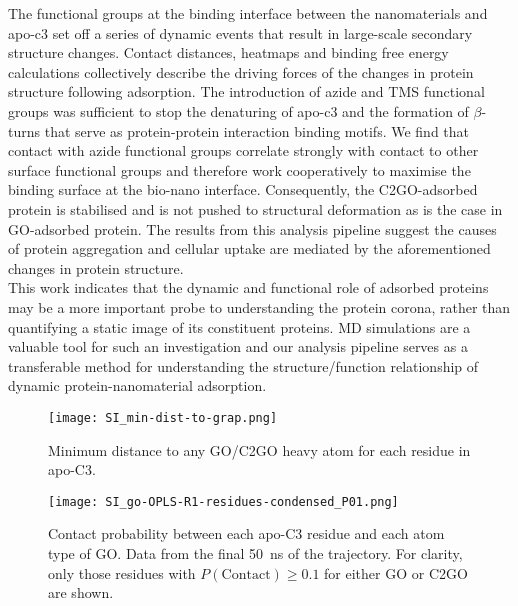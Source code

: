 The functional groups at the binding interface between the nanomaterials and apo-c3 set off a series of dynamic events that result in large-scale secondary structure changes. Contact distances, heatmaps and binding free energy calculations collectively describe the driving forces of the changes in protein structure following adsorption. The introduction of azide and TMS functional groups was sufficient to stop the denaturing of apo-c3 and the formation of $\beta$-turns that serve as protein-protein interaction binding motifs. We find that contact with azide functional groups correlate strongly with contact to other surface functional groups and therefore work cooperatively to maximise the binding surface at the bio-nano interface. Consequently, the C2GO-adsorbed protein is stabilised and is not pushed to structural deformation as is the case in GO-adsorbed protein. The results from this analysis pipeline suggest the causes of protein aggregation and cellular uptake are mediated by the aforementioned changes in protein structure. \\

This work indicates that the dynamic and functional role of adsorbed proteins may be a more important probe to understanding the protein corona, rather than quantifying a static image of its constituent proteins. MD simulations are a valuable tool for such an investigation and our analysis pipeline serves as a transferable method for understanding the structure/function relationship of dynamic protein-nanomaterial adsorption.

%
\begin{figure}[ht!]
    \centering
    \texttt{[image: SI\_min-dist-to-grap.png]}
    \caption{Minimum distance to any GO/C2GO heavy atom for each residue in apo-C3.}
    \label{fig:mid-dist-to-grap}
\end{figure}

\begin{figure}
    \centering
    \texttt{[image: SI\_go-OPLS-R1-residues-condensed\_P01.png]}
    \caption{Contact probability between each apo-C3 residue and each atom type of GO. Data from the final \SI{50}{\nano\second} of the trajectory. For clarity, only those residues with $P(\mathrm{Contact}) \geq 0.1$ for either GO or C2GO are shown.}
    \label{fig:prot-go-contacts}
\end{figure}

